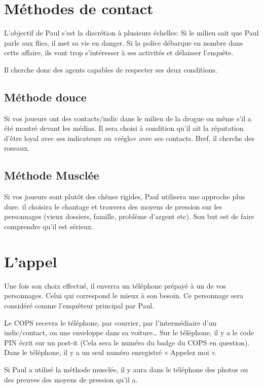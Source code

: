 \documentclass[10pt,a5paper,oneside]{book}
\begin{document}
\section{Méthodes de contact}

L'objectif de Paul s'est la discrétion à plusieurs échelles: 
Si le milieu sait que Paul parle aux flics, il met sa vie en danger.
Si la police débarque en nombre dans cette affaire, ils vont trop s'intéresser à ses activités et délaisser l’enquête.

Il cherche donc des agents capables de respecter ses deux conditions.

\subsection{Méthode douce}

Si vos joueurs ont des contacts/indic dans le milieu de la drogue ou même s'il a été montré devant les médias. Il sera choisi à condition qu'il ait la réputation d'être loyal avec ses 
indicateurs ou «réglo» avec ses contacts. Bref, il cherche des roseaux.

\subsection{Méthode Musclée }

Si vos joueurs sont plutôt des chênes rigides, Paul utilisera une approche plus dure. 
il choisira le chantage et trouvera des moyens de pression sur les personnages (vieux dossiers, famille, problème d'argent etc). 
Son but est de faire comprendre qu'il est sérieux.

\section{ L'appel}

Une fois son choix effectué, il enverra un téléphone prépayé à un de vos personnages. 
Celui qui correspond le mieux à son besoin. Ce personnage sera considéré comme l'enquêteur principal par Paul. 

Le COPS recevra le téléphone, par courrier, par l'intermédiaire d'un indic/contact, ou une enveloppe dans sa voiture…
Sur le téléphone, il y a le code PIN écrit sur un post-it (Cela sera le numéro du badge du COPS en question).
Dans le téléphone, il y a un seul numéro enregistré « Appelez moi ».

Si Paul a utilisé la méthode musclée, il y aura dans le téléphone des photos ou des preuves des moyens de pression qu'il a.
\end{document}
